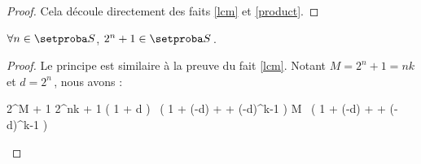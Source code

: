 \begin{proof}
	Cela découle directement des faits \ref{lcm} et \ref{product}.
\end{proof}




\begin{fact}
	$\forall n \in \ourset$, $2^n + 1 \in \ourset$\,.
\end{fact}

\begin{proof}
	Le principe est similaire à la preuve du fait \ref{lcm}.
	Notant $M = 2^n + 1 = n k$ et $d = 2^n$\,, nous avons :

	\medskip
	
	\begin{stepcalc}[style = sar]
		2^M + 1
	\explnext{}
		2^{nk} + 1
	\explnext{}
		\big( 1 + d \big) \, \big( 1 + (-d) + \cdots + (-d)^{k-1} \big)
	\explnext{}
		M \, \big( 1 + (-d) + \cdots + (-d)^{k-1} \big)
	\end{stepcalc}
\end{proof}


